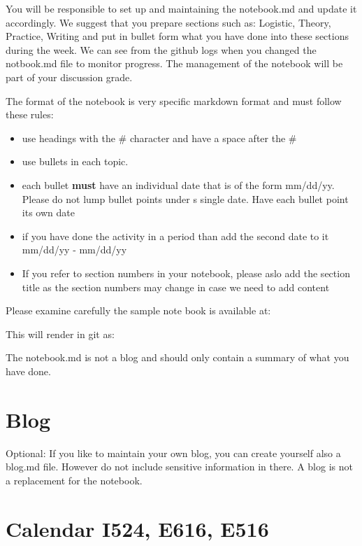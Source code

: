 You will be responsible to set up and maintaining the notebook.md and
update it accordingly. We suggest that you prepare sections such as:
Logistic, Theory, Practice, Writing and put in bullet form what you have
done into these sections during the week. We can see from the github
logs when you changed the notbook.md file to monitor progress. The
management of the notebook will be part of your discussion grade.

The format of the notebook is very specific markdown format and must
follow these rules:

\begin{itemize}
\item use headings with the \# character and have a space after the \#
\item use bullets in each topic.
\item each bullet \textbf{must} have an individual date that is of the
  form mm/dd/yy. Please do not lump bullet points under s single
  date. Have each bullet point its own date
\item if you have done the activity in a period than add the second
  date to it mm/dd/yy - mm/dd/yy
\item If you refer to section numbers in your notebook, please aslo
  add the section title as the section numbers may change in case we
  need to add content
\end{itemize}

Please examine carefully the sample note book is available at:


This will render in git as:


The notebook.md is not a blog and should only contain a summary of
what you have done. 

\section{Blog}

Optional: If you like to maintain your own blog, you can create yourself also a
blog.md file. However do not include sensitive information in
there. A blog is not a replacement for the notebook.

\section{Calendar I524, E616, E516}\label{S:calendar}

